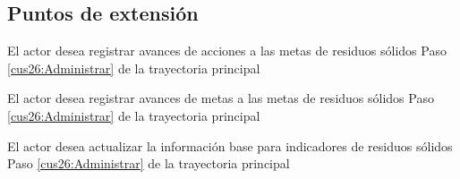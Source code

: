 \subsection{Puntos de extensión}

\UCExtensionPoint
{El actor desea registrar avances de acciones a las metas de residuos sólidos}
{ Paso \ref{cus26:Administrar} de la trayectoria principal}
{}

\UCExtensionPoint
{El actor desea registrar avances de metas a las metas de residuos sólidos}
{ Paso \ref{cus26:Administrar} de la trayectoria principal}
{}

\UCExtensionPoint
{El actor desea actualizar la información base para indicadores de residuos sólidos}
{ Paso \ref{cus26:Administrar} de la trayectoria principal}
{}